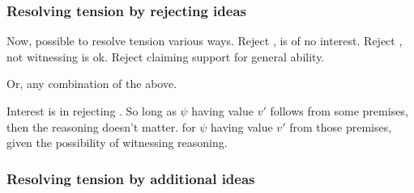 \subsubsection{Resolving tension by rejecting ideas}
\label{sec:resolv-tens-reject}

\begin{note}
  Now, possible to resolve tension various ways.
  Reject \ideaCS{}, \csN{} is of no interest.
  Reject \ESU{}, not witnessing is ok.
  Reject claiming support for general ability.

  Or, any combination of the above.

  Interest is in rejecting \ESU{}.
  So long as \(\psi\) having value \(v'\) follows from some premises, then the reasoning doesn't matter.
   for \(\psi\) having value \(v'\) from those premises, given the possibility of witnessing reasoning.
\end{note}

\subsubsection{Resolving tension by additional ideas}
\label{sec:resolv-tens-addit}

